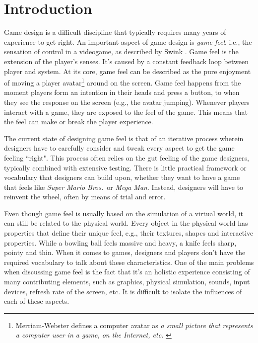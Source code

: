 \section{Introduction}
Game design is a difficult discipline that typically requires many years of experience to get right. An important aspect of game design is \textit{game feel}, i.e., the sensation of control in a videogame, as described by Swink \cite{swink}. Game feel is the extension of the player's senses. It's caused by a constant feedback loop between player and system. At its core, game feel can be described as the pure enjoyment of moving a player avatar\footnote{Merriam-Webster defines a computer avatar as \textit{a small picture that represents a computer user in a game, on the Internet, etc.} \cite{avatar}} around on the screen. Game feel happens from the moment players form an intention in their heads and press a button, to when they see the response on the screen (e.g., the avatar jumping). Whenever players interact with a game, they are exposed to the feel of the game. This means that the feel can make or break the player experience.

The current state of designing game feel is that of an iterative process wherein designers have to carefully consider and tweak every aspect to get the game feeling ``right". This process often relies on the gut feeling of the game designers, typically combined with extensive testing. There is little practical framework or vocabulary that designers can build upon, whether they want to have a game that feels like \textit{Super Mario Bros.}\ or \textit{Mega Man}. Instead, designers will have to reinvent the wheel, often by means of trial and error.

Even though game feel is usually based on the simulation of a virtual world, it can still be related to the physical world. Every object in the physical world has properties that define their unique feel, e.g., their textures, shapes and interactive properties. While a bowling ball feels massive and heavy, a knife feels sharp, pointy and thin. When it comes to games, designers and players don't have the required vocabulary to talk about these characteristics. One of the main problems when discussing game feel is the fact that it's an holistic experience consisting of many contributing elements, such as graphics, physical simulation, sounds, input devices, refresh rate of the screen, etc. It is difficult to isolate the influences of each of these aspects.

